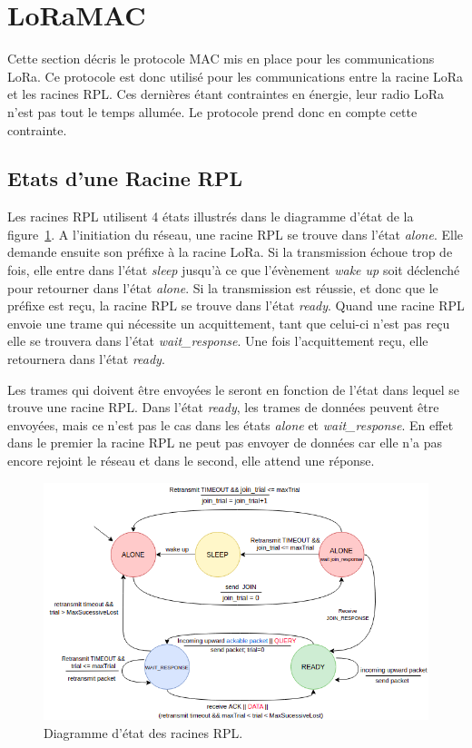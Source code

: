 \section{LoRaMAC}\label{sec:archi-loramac:proto}
\renewcommand{\rightmark}{LoRaMac}

    Cette section décris le protocole MAC mis en place pour les communications LoRa. Ce protocole est donc utilisé pour les communications entre la racine LoRa et les racines RPL. Ces dernières étant contraintes en énergie, leur radio LoRa n'est pas tout le temps allumée. Le protocole prend donc en compte cette contrainte.

\subsection*{Etats d'une Racine RPL}
    Les racines RPL utilisent 4 états illustrés dans le diagramme d'état de la figure~\ref{fig:archi-state}. A l'initiation du réseau, une racine RPL se trouve dans l'état \textit{alone}. Elle demande ensuite son préfixe à la racine LoRa. Si la transmission échoue trop de fois, elle entre dans l'état \textit{sleep} jusqu'à ce que l'évènement \textit{wake up} soit déclenché pour retourner dans l'état \textit{alone}. Si la transmission est réussie, et donc que le préfixe est reçu, la racine RPL se trouve dans l'état \textit{ready}. Quand une racine RPL envoie une trame qui nécessite un acquittement, tant que celui-ci n'est pas reçu elle se trouvera dans l'état \textit{wait\_response}. Une fois l'acquittement reçu, elle retournera dans l'état \textit{ready}.
    
    Les trames qui doivent être envoyées le seront en fonction de l'état dans lequel se trouve une racine RPL. Dans l'état \textit{ready}, les trames de données peuvent être envoyées, mais ce n'est pas le cas dans les états \textit{alone} et \textit{wait\_response}. En effet dans le premier la racine RPL ne peut pas envoyer de données car elle n'a pas encore rejoint le réseau et dans le second, elle attend une réponse.
    \begin{figure}[H]
        \centering
        \includegraphics[scale=0.5]{res/pictures/loramac-state.drawio.png}
        \caption{Diagramme d'état des racines RPL.}
        \label{fig:archi-state}
    \end{figure}

